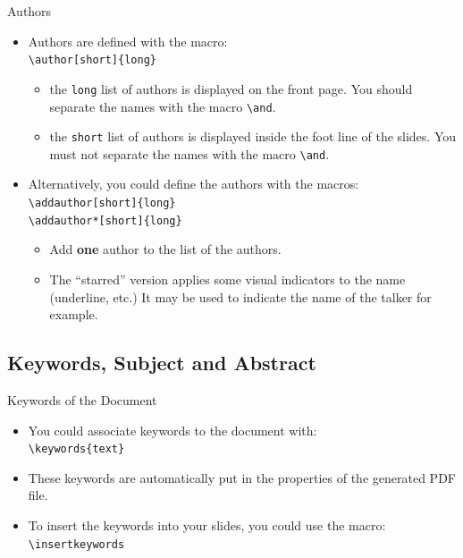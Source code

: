 \documentclass[english,sectioncirclenumberstyle]{le2iutbmbeamer}
\begin{document}
\begin{frame}{Authors}
	\begin{itemize}
	\item Authors are defined with the macro: \\
		\texttt{{\textbackslash}author[short]\{long\}}
		\begin{itemize}
		\item the \texttt{long} list of authors is displayed on the front page. You should separate the names with the macro \texttt{{\textbackslash}and}.
		\item the \texttt{short} list of authors is displayed inside the foot line of the slides. You \alert{must not separate} the names with the macro \texttt{{\textbackslash}and}.
		\end{itemize}
	\vfill
	\item \alert{Alternatively}, you could define the authors with the macros: \\
		\texttt{{\textbackslash}addauthor[short]\{long\}} \\
		\texttt{{\textbackslash}addauthor*[short]\{long\}}
		\begin{itemize}
		\item Add \textbf{one} author to the list of the authors.
		\item The ``starred'' version applies some visual indicators to the name (underline, etc.) It may be used to indicate the name of the talker for example.
		\end{itemize}
	\end{itemize}
	\vfill
\end{frame}

\subsection{Keywords, Subject and Abstract}

\begin{frame}{Keywords of the Document}
	\begin{itemize}
	\item You could associate keywords to the document with: \\
		\texttt{{\textbackslash}keywords\{text\}}
	\vspace{1em}
	\item These keywords are automatically put in the properties of the generated PDF file.
	\vspace{1em}
	\item To insert the keywords into your slides, you could use the macro: \\
			\texttt{{\textbackslash}insertkeywords}
	\end{itemize}
	\begin{example}
		\insertkeywords
	\end{example}
\end{frame}
\end{document}
